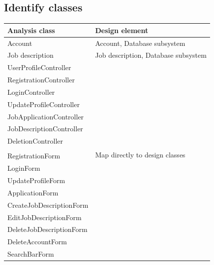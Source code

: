 \documentclass[a4paper]{article}
\begin{document}
\subsection{Identify classes}
\begin{center}
  \begin{tabular} { | l | l | }
    \hline
    \textbf{Analysis class}  & \textbf{Design element}                          \\
    \hline
    Account                  & Account, Database subsystem                      \\
    \hline
    Job description          & Job description, Database subsystem              \\
    \hline
    UserProfileController    & \multirow{16}{*}{Map directly to design classes} \\
    \cline{1-1}
    RegistrationController   &                                                  \\
    \cline{1-1}
    LoginController          &                                                  \\
    \cline{1-1}
    UpdateProfileController  &                                                  \\
    \cline{1-1}
    JobApplicationController &                                                  \\
    \cline{1-1}
    JobDescriptionController &                                                  \\
    \cline{1-1}
    DeletionController       &                                                  \\
    \cline{1-1}              &                                                  \\
    RegistrationForm         &                                                  \\
    \cline{1-1}
    LoginForm                &                                                  \\
    \cline{1-1}
    UpdateProfileForm        &                                                  \\
    \cline{1-1}
    ApplicationForm          &                                                  \\
    \cline{1-1}
    CreateJobDescriptionForm &                                                  \\
    \cline{1-1}
    EditJobDescriptionForm   &                                                  \\
    \cline{1-1}
    DeleteJobDescriptionForm &                                                  \\
    \cline{1-1}
    DeleteAccountForm        &                                                  \\
    \cline{1-1}
    SearchBarForm            &                                                  \\
    \hline
  \end{tabular}
\end{center}
\end{document}
